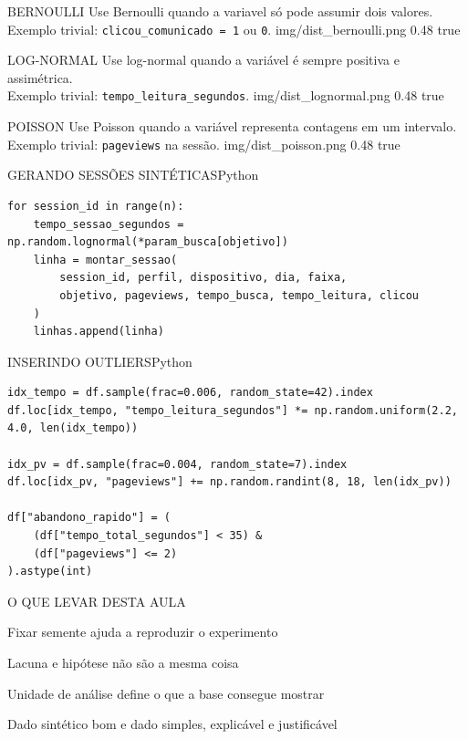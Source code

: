 \documentclass[aspectratio=169]{beamer}
\begin{document}
\rightimgslide
  {BERNOULLI}
  {Use Bernoulli quando a variavel só pode assumir dois valores.\\[0.7em]
   Exemplo trivial: \texttt{clicou\_comunicado = 1} ou \texttt{0}.}
  {img/dist_bernoulli.png}
  {0.48}
  {true}

\rightimgslide
  {LOG-NORMAL}
  {Use log-normal quando a variável é sempre positiva e assimétrica.\\[0.7em]
   Exemplo trivial: \texttt{tempo\_leitura\_segundos}.}
  {img/dist_lognormal.png}
  {0.48}
  {true}

\rightimgslide
  {POISSON}
  {Use Poisson quando a variável representa contagens em um intervalo.\\[0.7em]
   Exemplo trivial: \texttt{pageviews} na sessão.}
  {img/dist_poisson.png}
  {0.48}
  {true}

\begin{singlecodeslide}{GERANDO SESSÕES SINTÉTICAS}{Python}
\begin{lstlisting}
for session_id in range(n):
    tempo_sessao_segundos = np.random.lognormal(*param_busca[objetivo])
    linha = montar_sessao(
        session_id, perfil, dispositivo, dia, faixa,
        objetivo, pageviews, tempo_busca, tempo_leitura, clicou
    )
    linhas.append(linha)
\end{lstlisting}
\end{singlecodeslide}


\begin{singlecodeslide}{INSERINDO OUTLIERS}{Python}
\begin{lstlisting}
idx_tempo = df.sample(frac=0.006, random_state=42).index
df.loc[idx_tempo, "tempo_leitura_segundos"] *= np.random.uniform(2.2, 4.0, len(idx_tempo))

idx_pv = df.sample(frac=0.004, random_state=7).index
df.loc[idx_pv, "pageviews"] += np.random.randint(8, 18, len(idx_pv))

df["abandono_rapido"] = (
    (df["tempo_total_segundos"] < 35) &
    (df["pageviews"] <= 2)
).astype(int)
\end{lstlisting}
\end{singlecodeslide}

\bulletslide
  {O QUE LEVAR DESTA AULA}
  {}
  {
    \item Fixar semente ajuda a reproduzir o experimento
    \item Lacuna e hipótese não são a mesma coisa
    \item Unidade de análise define o que a base consegue mostrar
    \item Dado sintético bom e dado simples, explicável e justificável
  }

\end{document}
